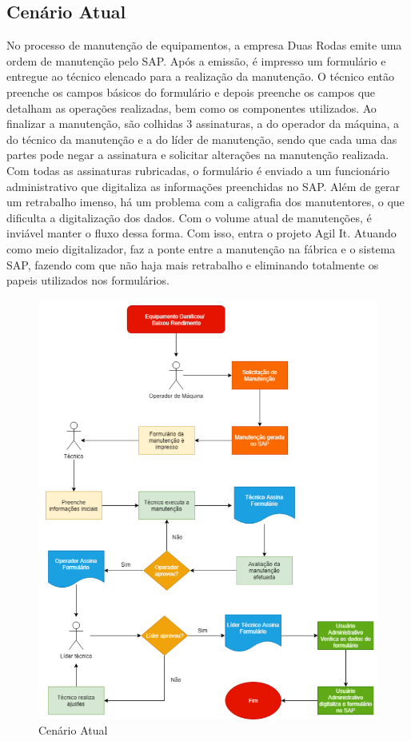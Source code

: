 \subsection{Cenário Atual}
No processo de manutenção de equipamentos, a empresa Duas Rodas emite uma ordem de manutenção pelo SAP. Após a emissão, é impresso um formulário e entregue ao técnico elencado para a realização da manutenção. O técnico então preenche os campos básicos do formulário e depois preenche os campos que detalham as operações realizadas, bem como os componentes utilizados. Ao finalizar a manutenção, são colhidas 3 assinaturas, a do operador da máquina, a do técnico da manutenção e a do líder de manutenção, sendo que cada uma das partes pode negar a assinatura e solicitar alterações na manutenção realizada. Com todas as assinaturas rubricadas, o formulário é enviado a um funcionário administrativo que digitaliza as informações preenchidas no SAP. Além de gerar um retrabalho imenso, há um problema com a caligrafia dos manutentores, o que dificulta a digitalização dos dados. Com o volume atual de manutenções, é inviável manter o fluxo dessa forma. Com isso, entra o projeto Agil It. Atuando como meio digitalizador, faz a ponte entre a manutenção na fábrica e o sistema SAP, fazendo com que não haja mais retrabalho e eliminando totalmente os papeis utilizados nos formulários.


\begin{figure}[htb]
	\caption{\label{cenario_atual1}Cenário Atual}
	\begin{center}
		\includegraphics[scale=0.55]{./Figuras/cenario-atual1.png}
	\end{center}
\end{figure}


